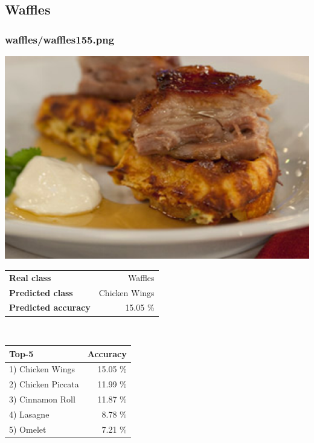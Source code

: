 \subsection{Waffles}
    
\subsubsection{waffles/waffles155.png}

\begin{minipage}[t]{0.4\textwidth}
	\vspace{0pt}
	\includegraphics[width=\linewidth]{images/evaluation-images/waffles/waffles155.png}
\end{minipage}
\hfill
\begin{minipage}[t]{0.5\textwidth}
	\vspace{0pt}\raggedright
	\begin{tabularx}{\textwidth}{X r}
		\small \textbf{Real class} & \small Waffles\\
		\small \textbf{Predicted class} & \small Chicken Wings\\
		\small \textbf{Predicted accuracy} & \small 15.05 \%
    \end{tabularx}\\
    
    \vspace{6pt}
	\begin{tabularx}{\textwidth}{X r}
        \small \textbf{Top-5} & \small \textbf{Accuracy} \\
        \hline
		\small 1) Chicken Wings & \small 15.05 \%\\\small 2) Chicken Piccata & \small 11.99 \%\\\small 3) Cinnamon Roll & \small 11.87 \%\\\small 4) Lasagne & \small 8.78 \%\\\small 5) Omelet & \small 7.21 \%
    \end{tabularx}
\end{minipage}
    
